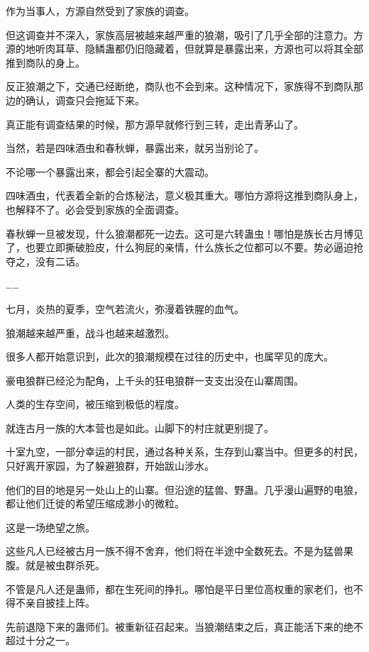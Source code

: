 
\begin{this_body}



作为当事人，方源自然受到了家族的调查。

但这调查并不深入，家族高层被越来越严重的狼潮，吸引了几乎全部的注意力。方源的地听肉耳草、隐鳞蛊都仍旧隐藏着，但就算是暴露出来，方源也可以将其全部推到商队的身上。

反正狼潮之下，交通已经断绝，商队也不会到来。这种情况下，家族得不到商队那边的确认，调查只会拖延下来。

真正能有调查结果的时候，那方源早就修行到三转，走出青茅山了。

当然，若是四味酒虫和春秋蝉，暴露出来，就另当别论了。

不论哪一个暴露出来，都会引起全寨的大震动。

四味酒虫，代表着全新的合炼秘法，意义极其重大。哪怕方源将这推到商队身上，也解释不了。必会受到家族的全面调查。

春秋蝉一旦被发现，什么狼潮都死一边去。这可是六转蛊虫！哪怕是族长古月博见了，也要立即撕破脸皮，什么狗屁的亲情，什么族长之位都可以不要。势必逼迫抢夺之，没有二话。

……

七月，炎热的夏季，空气若流火，弥漫着铁腥的血气。

狼潮越来越严重，战斗也越来越激烈。

很多人都开始意识到，此次的狼潮规模在过往的历史中，也属罕见的庞大。

豪电狼群已经沦为配角，上千头的狂电狼群一支支出没在山寨周围。

人类的生存空间，被压缩到极低的程度。

就连古月一族的大本营也是如此。山脚下的村庄就更别提了。

十室九空，一部分幸运的村民，通过各种关系，生存到山寨当中。但更多的村民，只好离开家园，为了躲避狼群，开始跋山涉水。

他们的目的地是另一处山上的山寨。但沿途的猛兽、野蛊。几乎漫山遍野的电狼，都让他们迁徙的希望压缩成渺小的微粒。

这是一场绝望之旅。

这些凡人已经被古月一族不得不舍弃，他们将在半途中全数死去。不是为猛兽果腹。就是被虫群杀死。

不管是凡人还是蛊师，都在生死间的挣扎。哪怕是平日里位高权重的家老们，也不得不亲自披挂上阵。

先前退隐下来的蛊师们。被重新征召起来。当狼潮结束之后，真正能活下来的绝不超过十分之一。


\end{this_body}
